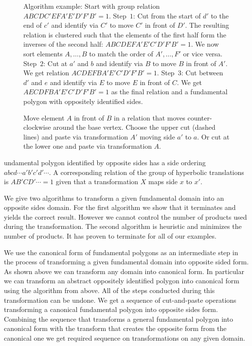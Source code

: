 \documentclass[Thesis.tex]{subfiles}
\begin{document}
\begin{figure}
\caption{Algorithm example: Start with group relation $ABCDC' EFA'E'D'F'B' = 1$. Step~$1$: Cut from the start of $d'$ to the end of $c'$ and identify via $C'$ to move $C'$ in front of $D'$. The resulting relation is clustered such that the elements of the first half form the inverses of the second half: $ABCDEFA'E'C'D'F'B' = 1$. We now sort elements $A,\ldots,B$ to match the order of $A',\ldots,F'$ or vice versa. Step~$2$: Cut at $a'$ and $b$ and identify via $B$ to move $B$ in front of $A'$. We get relation $ACDEFBA'E'C'D'F'B' = 1$. Step~$3$: Cut between $d'$ and $e$ and identify via $E$ to move $E$ in front of $C$. We get $AECDFBA'E'C'D'F'B' = 1$ as the final relation and a fundamental polygon with oppositely identified sides.}
\label{fig:opposite_algorithm}
\end{figure}

\begin{figure}
\centering
\resizebox{0.3\textwidth}{!} {

}
\caption{Move element $A$ in front of $B$ in a relation that moves counter-clockwise around the base vertex. Choose the upper cut (dashed lines) and paste via transformation $A'$ moving side $a'$ to $a$. Or cut at the lower one and paste via transformation $A$.}
\label{fig:cut-and-paste-motion}
\end{figure}

undamental polygon identified by opposite sides has a side ordering $abcd\cdots a'b'c'd'\cdots$. A corresponding relation of the group of hyperbolic translations is $AB'CD'\cdots=1$ given that a transformation $X$ maps side $x$ to $x'$.

We give two algorithms to transform a given fundamental domain into an opposite sides domain.
For the first algorithm we show that it terminates and yields the correct result. However we cannot control the number of products used during the transformation. The second algorithm is heuristic and minimizes the number of products. It has proven to terminate for all of our examples.

We use the canonical form of fundamental polygons as an intermediate step in the process of transforming a given fundamental domain into opposite sided form. As shown above we can transform any domain into canonical form. In particular we can transform an abstract oppositely identified polygon into canonical form using the algorithm from above. All of the steps conducted during this transformation can be undone. We get a sequence of cut-and-paste operations transforming a canonical fundamental polygon into opposite sides form. Combining the sequence that transforms a general fundamental polygon into canonical form with the transform that creates the opposite form from the canonical one we get required sequence on transformations on any given domain.
\end{document}
